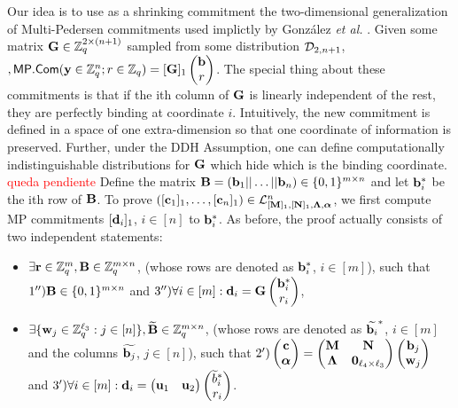 Our idea is to use as a shrinking commitment the two-dimensional generalization of Multi-Pedersen commitments used implictly by Gonz\'alez \textit{et al.} \cite{AC:GonHevRaf15}. Given some matrix $\mathbf{{G}} \in \mathbb{Z}_q^{2 \times (n+1)}$ sampled from some distribution $\mathcal{D}_{2,n+1}$, $,\mathsf{MP}.\mathsf{Com}(\mathbf{y} \in \mathbb{Z}_q^{n}; r \in \mathbb{Z}_q)=[\mathbf{{G}}]_1 \begin{pmatrix} \mathbf{b} \\ r \end{pmatrix}$. The special thing about these commitments is that if the ith column of 
$\mathbf{{G}}$ is linearly independent of the rest, they are perfectly binding at coordinate $i$. Intuitively, the new commitment is defined in a space of one extra-dimension so that one coordinate of information is preserved. Further, under
the DDH Assumption, one can define computationally indistinguishable distributions for $\mathbf{{G}}$ which hide which is the binding coordinate.    
\textcolor{red}{queda pendiente }
Define the matrix $\mathbf{{B}}=(\mathbf{b}_1|| \ldots || \mathbf{b}_n) \in \{0,1\}^{m \times n}$ and let $\mathbf{b}_i^*$ be the ith row of $\mathbf{{B}}$. To prove $([\mathbf{c}_1]_1,\ldots, [\mathbf{c}_n]_1) \in\mathcal{L}_{[\mathbf{{M}}]_1,[\mathbf{{N}}]_1,\mathbf{{\Lambda}},{\boldsymbol \alpha}}^n$, we first compute MP commitments $[\mathbf{d}_i]_1$, $i \in [n]$ to $\mathbf{b}_i^*$.  As before, 
the proof actually consists of two independent statements:
\begin{itemize}
\item $\exists \mathbf{r} \in \mathbb{Z}_q^m, \mathbf{{B}} \in \mathbb{Z}_q^{m \times n}$, (whose rows are denoted as $\mathbf{b}_i^*$, $i \in [m]$), such that  
$1'') \mathbf{{B}} \in \{0,1\}^{m \times n}$ and $3'') \forall i \in [m]: \mathbf{d}_i=\mathbf{{G}}\begin{pmatrix}
\mathbf{b}_i^*  \\ r_i  
\end{pmatrix}$,
\item $\exists \{\mathbf{w}_j \in\mathbb{Z}_q^{\ell_3}: j \in [n]\}, \widetilde{\mathbf{{B}}} \in \mathbb{Z}_q^{m \times n}$, (whose rows are denoted as $\widetilde{\mathbf{b}_i}^*$, $i \in [m]$ and the columns $\widetilde{\mathbf{b}_j}$, $j \in [n]$), such that  
   $2') \left(\begin{matrix}
    \mathbf{c}\\
    {\boldsymbol \alpha}
\end{matrix}\right)
=
\begin{pmatrix}
    \mathbf{{M}}       & \mathbf{{N}}\\
    \mathbf{{\Lambda}} & \mathbf{{0}}_{{\ell_4}\times {\ell_3}}
\end{pmatrix}
\left(\begin{matrix}
    \mathbf{b}_j\\
    \mathbf{w}_j
\end{matrix}\right)$ and $3') \forall i \in [m]: \mathbf{d}_i=\begin{pmatrix} \mathbf{u}_1 &   \mathbf{u}_2 \end{pmatrix}   \begin{pmatrix}
\widetilde{b}^*_i  \\ r_i  
\end{pmatrix}$.
\end{itemize}
